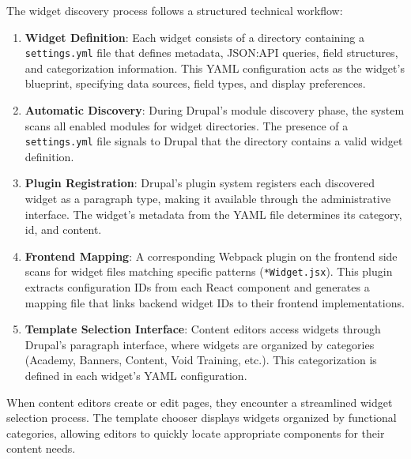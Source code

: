 \medskip

\noindent
The widget discovery process follows a structured technical workflow:

\begin{enumerate}
    \item \textbf{Widget Definition}: Each widget consists of a directory containing a \texttt{settings.yml} file that defines metadata, JSON:API queries, field structures, and categorization information. This YAML configuration acts as the widget's blueprint, specifying data sources, field types, and display preferences.
    
    \item \textbf{Automatic Discovery}: During Drupal's module discovery phase, the system scans all enabled modules for widget directories. The presence of a \texttt{settings.yml} file signals to Drupal that the directory contains a valid widget definition.
    
    \item \textbf{Plugin Registration}: Drupal's plugin system registers each discovered widget as a paragraph type, making it available through the administrative interface. The widget's metadata from the YAML file determines its category, id, and content.
    
    \item \textbf{Frontend Mapping}: A corresponding Webpack plugin on the frontend side scans for widget files matching specific patterns (\texttt{*Widget.jsx}). This plugin extracts configuration IDs from each React component and generates a mapping file that links backend widget IDs to their frontend implementations.
    
    \item \textbf{Template Selection Interface}: Content editors access widgets through Drupal's paragraph interface, where widgets are organized by categories (Academy, Banners, Content, Void Training, etc.). This categorization is defined in each widget's YAML configuration.
\end{enumerate}

\medskip

\noindent
When content editors create or edit pages, they encounter a streamlined widget selection process. The template chooser displays widgets organized by functional categories, allowing editors to quickly locate appropriate components for their content needs.

